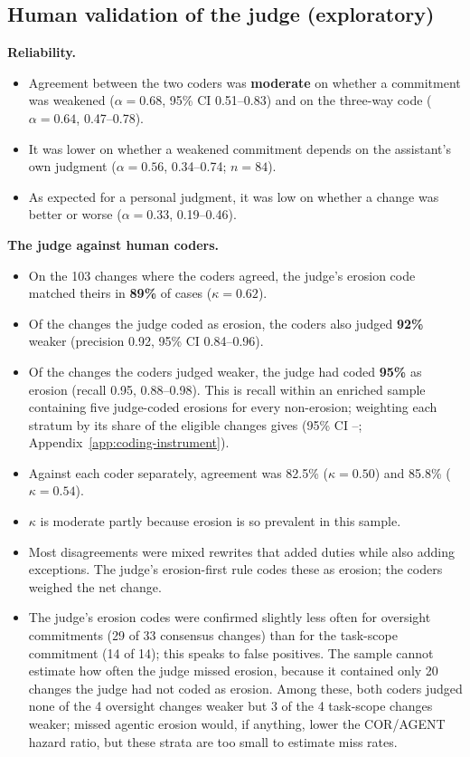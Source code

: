 \subsection{Human validation of the judge (exploratory)}
\label{sec:human-validation}

\textbf{Reliability.}
\begin{itemize}
\item Agreement between the two coders was \textbf{moderate} on whether a commitment was weakened ($\alpha = 0.68$, 95\% CI 0.51--0.83) and on the three-way code ($\alpha = 0.64$, 0.47--0.78).
\item It was lower on whether a weakened commitment depends on the assistant's own judgment ($\alpha = 0.56$, 0.34--0.74; $n = 84$).
\item As expected for a personal judgment, it was low on whether a change was better or worse ($\alpha = 0.33$, 0.19--0.46).
\end{itemize}

\textbf{The judge against human coders.}
\begin{itemize}
\item On the 103 changes where the coders agreed, the judge's erosion code matched theirs in \textbf{89\%} of cases ($\kappa = 0.62$).
\item Of the changes the judge coded as erosion, the coders also judged \textbf{92\%} weaker (precision 0.92, 95\% CI 0.84--0.96).
\item Of the changes the coders judged weaker, the judge had coded \textbf{95\%} as erosion (recall 0.95, 0.88--0.98). This is recall within an enriched sample containing five judge-coded erosions for every non-erosion; weighting each stratum by its share of the eligible changes gives \WRecall{} (95\% CI \WRecallLo--\WRecallHi; Appendix~\ref{app:coding-instrument}).
\item Against each coder separately, agreement was 82.5\% ($\kappa = 0.50$) and 85.8\% ($\kappa = 0.54$).
\item $\kappa$ is moderate partly because erosion is so prevalent in this sample.
\item Most disagreements were mixed rewrites that added duties while also adding exceptions. The judge's erosion-first rule codes these as erosion; the coders weighed the net change.
\item The judge's erosion codes were confirmed slightly less often for oversight commitments (29 of 33 consensus changes) than for the task-scope commitment (14 of 14); this speaks to false positives. The sample cannot estimate how often the judge missed erosion, because it contained only 20 changes the judge had not coded as erosion. Among these, both coders judged none of the 4 oversight changes weaker but 3 of the 4 task-scope changes weaker; missed agentic erosion would, if anything, lower the COR/AGENT hazard ratio, but these strata are too small to estimate miss rates.
\end{itemize}

